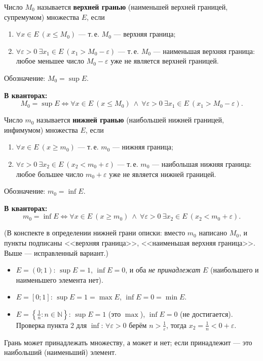 \documentclass[a4paper,11pt]{article}
\newcommand{\N}{\mathbb{N}}
\newcommand{\eps}{\varepsilon}
\newcommand{\kv}{\par\noindent\textbf{\textcolor{oprc!85!black}{В кванторах:}}}
\begin{document}
\begin{opr}
Число $M_0$ называется \textbf{верхней гранью} (наименьшей верхней границей, супремумом) множества $E$, если
\begin{enumerate}
  \item $\forall x \in E\ (x \le M_0)$ --- т.\,е. $M_0$ --- верхняя граница;
  \item $\forall \eps > 0\ \exists x_1 \in E\ (x_1 > M_0 - \eps)$ --- т.\,е. $M_0$ --- наименьшая верхняя граница:
        любое меньшее число $M_0 - \eps$ уже не является верхней границей.
\end{enumerate}
Обозначение: $M_0 = \sup E$.
\kv
\[
  M_0 = \sup E \Leftrightarrow \forall x \in E\ (x \le M_0)\ \wedge\ \forall \eps > 0\ \exists x_1 \in E\ (x_1 > M_0 - \eps).
\]
\end{opr}

\begin{opr}
Число $m_0$ называется \textbf{нижней гранью} (наибольшей нижней границей, инфимумом) множества $E$, если
\begin{enumerate}
  \item $\forall x \in E\ (x \ge m_0)$ --- т.\,е. $m_0$ --- нижняя граница;
  \item $\forall \eps > 0\ \exists x_2 \in E\ (x_2 < m_0 + \eps)$ --- т.\,е. $m_0$ --- наибольшая нижняя граница:
        любое большее число $m_0 + \eps$ уже не является нижней границей.
\end{enumerate}
Обозначение: $m_0 = \inf E$.
\kv
\[
  m_0 = \inf E \Leftrightarrow \forall x \in E\ (x \ge m_0)\ \wedge\ \forall \eps > 0\ \exists x_2 \in E\ (x_2 < m_0 + \eps).
\]
\end{opr}

{\small\textcolor{zamc}{(В конспекте в определении нижней грани описки: вместо $m_0$ написано $M_0$, и пункты подписаны
<<верхняя граница>>, <<наименьшая верхняя граница>>. Выше --- исправленный вариант.)}}

\begin{dop}[примеры]
\begin{itemize}
  \item $E = (0; 1)$: $\sup E = 1$, $\inf E = 0$, и оба \emph{не принадлежат} $E$ (наибольшего и наименьшего элемента нет).
  \item $E = [0; 1]$: $\sup E = 1 = \max E$, $\inf E = 0 = \min E$.
  \item $E = \left\{\frac1n : n \in \N\right\}$: $\sup E = 1$ (это $\max$), $\inf E = 0$ (не достигается).
        Проверка пункта 2 для $\inf$: $\forall \eps > 0$ берём $n > \frac1\eps$, тогда $x_2 = \frac1n < 0 + \eps$.
\end{itemize}
Грань может принадлежать множеству, а может и нет; если принадлежит --- это наибольший (наименьший) элемент.
\end{dop}
\end{document}
